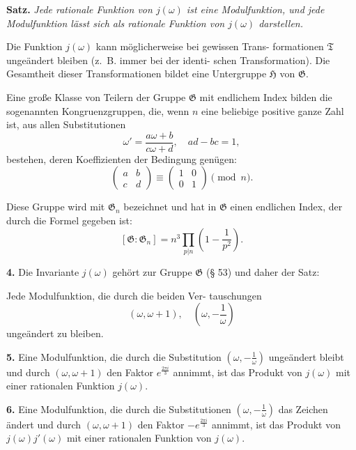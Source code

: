 \documentclass[12pt,a4paper]{article}
\theoremstyle{definition}
\begin{document}
\textbf{Satz.} \textit{Jede rationale Funktion von $j(\omega)$ ist eine
Modulfunktion, und jede Modulfunktion l\"{a}sst sich als rationale
Funktion von $j(\omega)$ darstellen.}

Die Funktion $j(\omega)$ kann m\"{o}glicherweise bei gewissen Trans-
formationen $\mathfrak{T}$ unge\"{a}ndert bleiben (z.~B. immer bei der identi-
schen Transformation). Die Gesamtheit dieser Transformationen
bildet eine Untergruppe $\mathfrak{H}$ von $\mathfrak{G}$.

Eine gro\ss e Klasse von Teilern der Gruppe $\mathfrak{G}$ mit endlichem
Index bilden die sogenannten Kongruenzgruppen, die, wenn
$n$ eine beliebige positive ganze Zahl ist, aus allen Substitutionen
\begin{equation}\tag{3}
\omega' = \frac{a\omega + b}{c\omega + d}, \quad ad - bc = 1,
\end{equation}
bestehen, deren Koeffizienten der Bedingung gen\"{u}gen:
\begin{equation}\tag{4}
\begin{pmatrix} a & b \\ c & d \end{pmatrix} \equiv \begin{pmatrix} 1 & 0 \\ 0 & 1 \end{pmatrix} \pmod{n}.
\end{equation}

Diese Gruppe wird mit $\mathfrak{G}_n$ bezeichnet und hat in $\mathfrak{G}$ einen
endlichen Index, der durch die Formel gegeben ist:
\begin{equation}\tag{5}
[\mathfrak{G} : \mathfrak{G}_n] = n^3 \prod_{p|n}\left(1 - \frac{1}{p^2}\right).
\end{equation}

\textbf{4.} Die Invariante $j(\omega)$ geh\"{o}rt zur Gruppe $\mathfrak{G}$ (\S{} 53) und
daher der Satz:

Jede Modulfunktion, die durch die beiden Ver-
tauschungen
\[
(\omega, \omega + 1), \quad \left(\omega, -\frac{1}{\omega}\right)
\]
unge\"{a}ndert zu bleiben.

\textbf{5.} Eine Modulfunktion, die durch die Substitution
$(\omega, -\frac{1}{\omega})$ unge\"{a}ndert bleibt und durch $(\omega, \omega + 1)$ den
Faktor $e^{\frac{2\pi i}{3}}$ annimmt, ist das Produkt von $j(\omega)$ mit
einer rationalen Funktion $j(\omega)$.

\textbf{6.} Eine Modulfunktion, die durch die Substitutionen
$(\omega, -\frac{1}{\omega})$ das Zeichen \"{a}ndert und durch $(\omega, \omega + 1)$ den
Faktor $-e^{\frac{2\pi i}{3}}$ annimmt, ist das Produkt von $j(\omega)j'(\omega)$
mit einer rationalen Funktion von $j(\omega)$.
\end{document}
